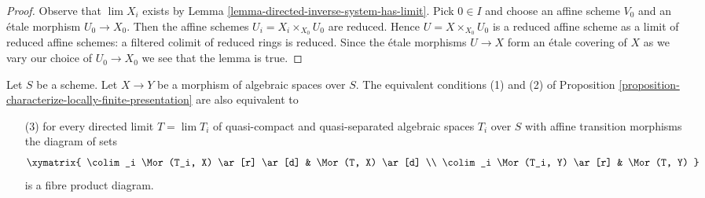 \begin{proof}
Observe that $\lim X_i$ exists by
Lemma \ref{lemma-directed-inverse-system-has-limit}.
Pick $0 \in I$ and choose an affine scheme $V_0$ and an \'etale morphism
$U_0 \to X_0$. Then the affine schemes
$U_i = X_i \times_{X_0} U_0$ are reduced.
Hence $U = X \times_{X_0} U_0$
is a reduced affine scheme as a limit of reduced affine schemes:
a filtered colimit of reduced rings is reduced.
Since the \'etale morphisms $U \to X$ form an
\'etale covering of $X$ as we vary our choice of $U_0 \to X_0$
we see that the lemma is true.
\end{proof}

\begin{lemma}
\label{lemma-better-characterize-relative-limit-preserving}
Let $S$ be a scheme. Let $X \to Y$ be a morphism of algebraic spaces
over $S$. The equivalent conditions (1) and (2) of
Proposition \ref{proposition-characterize-locally-finite-presentation}
are also equivalent to
\begin{enumerate}
\item[(3)] for every directed limit $T = \lim T_i$ of quasi-compact
and quasi-separated algebraic spaces $T_i$ over $S$ with affine
transition morphisms the diagram of sets
$$
\xymatrix{
\colim_i \Mor(T_i, X) \ar[r] \ar[d] & \Mor(T, X) \ar[d] \\
\colim_i \Mor(T_i, Y) \ar[r] & \Mor(T, Y)
}
$$
is a fibre product diagram.
\end{enumerate}
\end{lemma}

